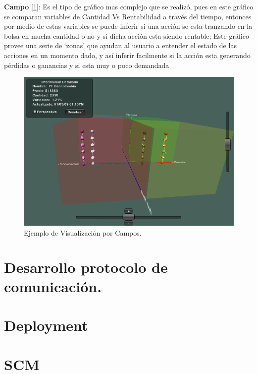 \textbf{Campo} [\ref{fig:Campo}]: Es el tipo de gráfico mas complejo que se realizó, pues en este gráfico se comparan variables de Cantidad Vs Rentabilidad a través del tiempo, entonces por medio de estas variables se puede inferir si una acción se esta tranzando en la bolsa en mucha cantidad o no y si dicha acción esta siendo rentable; Este gráfico provee una serie de `zonas' que ayudan al usuario a entender el estado de las acciones en un momento dado, y así inferir facilmente si la acción esta generando pérdidas o ganancias y si esta muy o poco demandada\\

\begin{figure}[h]
	\centering
		\includegraphics[scale=0.5]{Campo.png}
		\caption{Ejemplo de Visualización por Campos.}
	\label{fig:Campo}
\end{figure}
 

\section{Desarrollo protocolo de comunicación.}

\section{Deployment}

\section{SCM}